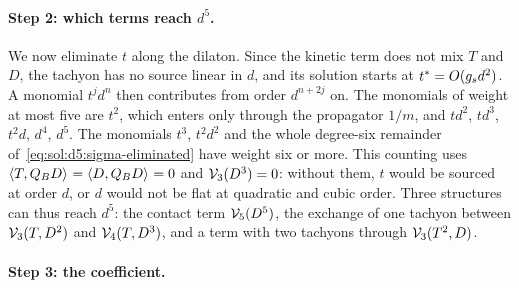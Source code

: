 \paragraph{Step 2: which terms reach $d^5$.}

We now eliminate $t$ along the dilaton.
Since the kinetic term does not mix $T$ and $D$, the tachyon has no source linear in $d$, and its solution starts at $t^* = O(g_s d^2)$.
A monomial $t^j d^n$ then contributes from order $d^{n + 2 j}$ on.
The monomials of weight at most five are $t^2$, which enters only through the propagator $1 / m$, and $t d^2$, $t d^3$, $t^2 d$, $d^4$, $d^5$.
The monomials $t^3$, $t^2 d^2$ and the whole degree-six remainder of~\eqref{eq:sol:d5:sigma-eliminated} have weight six or more.
This counting uses $\braket{T, Q_B D}_{} = \braket{D, Q_B D}_{} = 0$ and $\mathcal{V}_{3}(D^3) = 0$: without them, $t$ would be sourced at order $d$, or $d$ would not be flat at quadratic and cubic order.
Three structures can thus reach $d^5$: the contact term $\mathcal{V}_{5}(D^5)$, the exchange of one tachyon between $\mathcal{V}_{3}(T, D^2)$ and $\mathcal{V}_{4}(T, D^3)$, and a term with two tachyons through $\mathcal{V}_{3}(T^2, D)$.

\paragraph{Step 3: the coefficient.}


